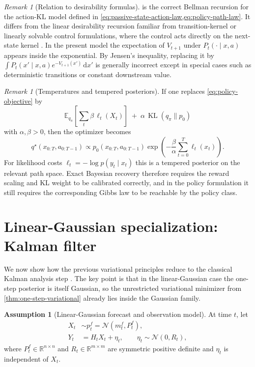 \documentclass[11pt]{article}
\newcommand{\R}{\mathbb{R}}
\newcommand{\E}{\mathbb{E}}
\newcommand{\KL}{\operatorname{KL}}
\newcommand{\dd}{\,\mathrm d}
\newcommand{\xtraj}{x_{0:T}}
\newcommand{\atraj}{a_{0:T-1}}
\newcommand{\qpi}{q_\pi}
\newcommand{\bracks}[1]{\left[ #1 \right]}
\numberwithin{equation}{section}
\theoremstyle{plain}
\theoremstyle{definition}
\newtheorem{assumption}[theorem]{Assumption}
\theoremstyle{remark}
\newtheorem{remark}[theorem]{Remark}
\begin{document}
\begin{remark}[Relation to desirability formulas]
\label{rem:desirability-caveat}
 is the correct Bellman recursion for the action-KL model defined in \cref{eq:passive-state-action-law,eq:policy-path-law}. It differs from the linear desirability recursion familiar from transition-kernel or linearly solvable control formulations, where the control acts directly on the next-state kernel \citep{todorov2006,todorov2009}. In the present model the expectation of $V_{t+1}$ under $P_t(\cdot\mid x,a)$ appears inside the exponential. By Jensen's inequality, replacing it by $\int P_t(x'\mid x,a)e^{-V_{t+1}(x')}\dd x'$ is generally incorrect except in special cases such as deterministic transitions or constant downstream value.
\end{remark}

\begin{remark}[Temperatures and tempered posteriors]
\label{rem:temperature}
If one replaces \cref{eq:policy-objective} by
\[
\E_{\qpi}\!\bracks{\sum_t \beta\,\ell_t(X_t)}
\;+\;
\alpha\,\KL(\qpi\|p_0)
\]
with $\alpha,\beta>0$, then the optimizer becomes
\[
q^\star(\xtraj,\atraj)
\propto
p_0(\xtraj,\atraj)\exp\!\left(-\frac{\beta}{\alpha}\sum_{t=0}^{T}\ell_t(x_t)\right).
\]
For likelihood costs $\ell_t=-\log p(y_t\mid x_t)$ this is a tempered posterior on the relevant path space. Exact Bayesian recovery therefore requires the reward scaling and KL weight to be calibrated correctly, and in the policy formulation it still requires the corresponding Gibbs law to be reachable by the policy class.
\end{remark}

\section{Linear-Gaussian specialization: Kalman filter}
\label{sec:linear-gaussian}

We now show how the previous variational principles reduce to the classical Kalman analysis step \citep{kalman1960}. The key point is that in the linear-Gaussian case the one-step posterior is itself Gaussian, so the unrestricted variational minimizer from \cref{thm:one-step-variational} already lies inside the Gaussian family.

\begin{assumption}[Linear-Gaussian forecast and observation model]
\label{ass:linear-gaussian}
At time $t$, let
\begin{align}
X_t &\sim p_t^f = \mathcal N(m_t^f,P_t^f), \\
Y_t &= H_tX_t + \eta_t, \qquad \eta_t\sim \mathcal N(0,R_t),
\end{align}
where $P_t^f\in\R^{n\times n}$ and $R_t\in\R^{m\times m}$ are symmetric positive definite and $\eta_t$ is independent of $X_t$.
\end{assumption}
\end{document}
